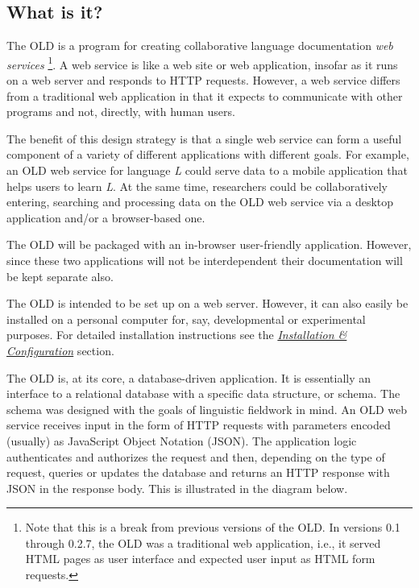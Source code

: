\documentclass[letterpaper,10pt,english]{sphinxmanual}
\begin{document}
\subsection{What is it?}
\label{about:what-is-it}
The OLD is a program for creating collaborative language documentation \emph{web
services} \footnote{
Note that this is a break from previous versions of the OLD.  In
versions 0.1 through 0.2.7, the OLD was a traditional web application, i.e.,
it served HTML pages as user interface and expected user input as HTML form
requests.
}.  A web service is like a web site or web application, insofar
as it runs on a web server and responds to HTTP requests.  However, a web
service differs from a traditional web application in that it expects to
communicate with other programs and not, directly, with human users.

The benefit of this design strategy is that a single web service can form a
useful component of a variety of different applications with different goals.
For example, an OLD web service for language \emph{L} could serve data to a mobile
application that helps users to learn \emph{L}.  At the same time, researchers could
be collaboratively entering, searching and processing data on the OLD web
service via a desktop application and/or a browser-based one.

The OLD will be packaged with an in-browser user-friendly application.  However,
since these two applications will not be interdependent their documentation will
be kept separate also.

The OLD is intended to be set up on a web server.  However, it can also easily
be installed on a personal computer for, say, developmental or experimental
purposes.  For detailed installation instructions see the
{\hyperref[installation:installation-section]{\emph{Installation \& Configuration}}} section.

The OLD is, at its core, a database-driven application.  It is essentially an
interface to a relational database with a specific data structure, or schema.
The schema was designed with the goals of linguistic fieldwork in mind.  An OLD
web service receives input in the form of HTTP requests with parameters encoded
(usually) as JavaScript Object Notation (JSON).  The application logic
authenticates and authorizes the request and then, depending on the type of
request, queries or updates the database and returns an HTTP response with JSON
in the response body.  This is illustrated in the diagram below.
\end{document}
